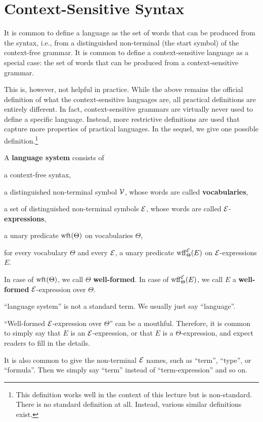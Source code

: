 \section{Context-Sensitive Syntax}

It is common to define a language as the set of words that can be produced from the syntax, i.e., from a distinguished non-terminal (the start symbol) of the context-free grammar.
It is common to define a context-sensitive language as a special case: the set of words that can be produced from a context-sensitive grammar.

This is, however, not helpful in practice.
While the above remains the official definition of what the context-sensitive languages are, all practical definitions are entirely different.
In fact, context-sensitive grammars are virtually never used to define a specific language.
Instead, more restrictive definitions are used that capture more properties of practical languages.
In the sequel, we give one possible definition.\footnote{This definition works well in the context of this lecture but is non-standard. There is no standard definition at all. Instead, various similar definitions exist.}

\begin{definition}
A \textbf{language system} consists of
\begin{compactitem}
 \item a context-free syntax,
 \item a distinguished non-terminal symbol $\mathcal{V}$, whose words are called \textbf{vocabularies},
 \item a set of distinguished non-terminal symbols $\mathcal{E}$, whose words are called $\mathcal{E}$-\textbf{expressions},
 \item a unary predicate $\mathrm{wft}(\Theta)$ on vocabularies $\Theta$,
 \item for every vocabulary $\Theta$ and every $\mathcal{E}$, a unary predicate $\mathrm{wff}_{\Theta}^{\mathcal{E}}(E)$ on $\mathcal{E}$-expressions $E$.
\end{compactitem}

In case of $\mathrm{wft}(\Theta)$, we call $\Theta$ \textbf{well-formed}.
In case of $\mathrm{wff}_{\Theta}^{\mathcal{E}}(E)$, we call $E$ a \textbf{well-formed} $\mathcal{E}$-expression over $\Theta$.
\end{definition}

\begin{remark}[Terminology]
``language system'' is not a standard term. We usually just say ``language''.

``Well-formed $\mathcal{E}$-expression over $\Theta$'' can be a mouthful.
Therefore, it is common to simply say that $E$ is an $\mathcal{E}$-expression, or that $E$ is a $\Theta$-expression, and expect readers to fill in the details.

It is also common to give the non-terminal $\mathcal{E}$ names, such as ``term'', ``type'', or ``formula''.
Then we simply say ``term'' instead of ``term-expression'' and so on.
\end{remark}

